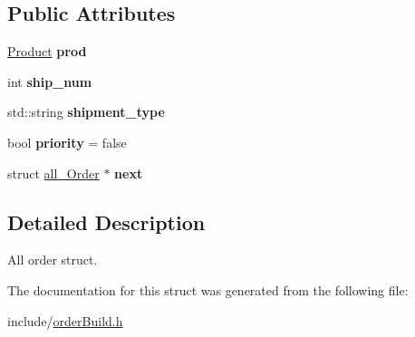 \subsection*{Public Attributes}
\begin{DoxyCompactItemize}
\item 
\mbox{\label{structall__Order_abc229a6a4397223dda36c862d7a3b54c}} 
\hyperlink{structProduct}{Product} {\bfseries prod}
\item 
\mbox{\label{structall__Order_ad4b0a583424de97e7803edae8e163644}} 
int {\bfseries ship\+\_\+num}
\item 
\mbox{\label{structall__Order_a1f394679c4b09fab73b5e7b0284481a9}} 
std\+::string {\bfseries shipment\+\_\+type}
\item 
\mbox{\label{structall__Order_a75278cdaa72ad356e1408c77a7d17c1c}} 
bool {\bfseries priority} = false
\item 
\mbox{\label{structall__Order_a27427252ea752809669ea6cafd3f334d}} 
struct \hyperlink{structall__Order}{all\+\_\+\+Order} $\ast$ {\bfseries next}
\end{DoxyCompactItemize}


\subsection{Detailed Description}
All order struct. 

The documentation for this struct was generated from the following file\+:\begin{DoxyCompactItemize}
\item 
include/\hyperlink{orderBuild_8h}{order\+Build.\+h}\end{DoxyCompactItemize}
